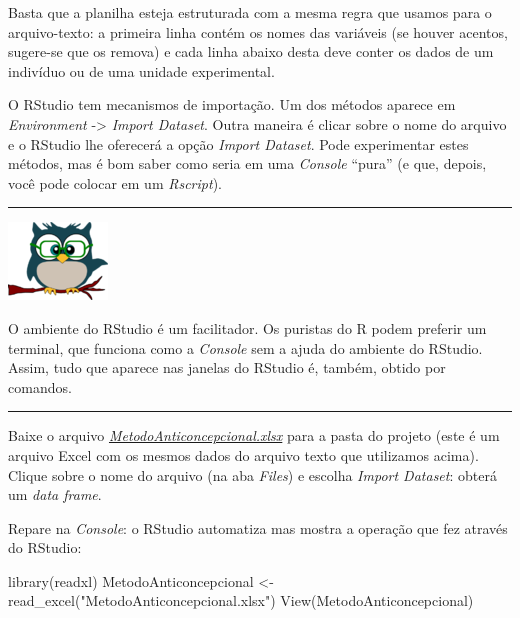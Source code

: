 \documentclass[
]{article}
\newenvironment{Shaded}{\begin{snugshade}}{\end{snugshade}}
\newcommand{\FunctionTok}[1]{\textcolor[rgb]{0.00,0.00,0.00}{#1}}
\newcommand{\NormalTok}[1]{#1}
\newcommand{\OtherTok}[1]{\textcolor[rgb]{0.56,0.35,0.01}{#1}}
\newcommand{\StringTok}[1]{\textcolor[rgb]{0.31,0.60,0.02}{#1}}
\begin{document}
Basta que a planilha esteja estruturada com a mesma regra que usamos
para o arquivo-texto: a primeira linha contém os nomes das variáveis (se
houver acentos, sugere-se que os remova) e cada linha abaixo desta deve
conter os dados de um indivíduo ou de uma unidade experimental.

O RStudio tem mecanismos de importação. Um dos métodos aparece em
\emph{Environment} -\textgreater{} \emph{Import Dataset}. Outra maneira
é clicar sobre o nome do arquivo e o RStudio lhe oferecerá a opção
\emph{Import Dataset}. Pode experimentar estes métodos, mas é bom saber
como seria em uma \emph{Console} ``pura'' (e que, depois, você pode
colocar em um \emph{Rscript}).

\begin{center}\rule{0.5\linewidth}{0.5pt}\end{center}

\begin{flushleft}\includegraphics[width=0.08\linewidth]{coruja} \end{flushleft}

O ambiente do RStudio é um facilitador. Os puristas do R podem preferir
um terminal, que funciona como a \emph{Console} sem a ajuda do ambiente
do RStudio. Assim, tudo que aparece nas janelas do RStudio é, também,
obtido por comandos.

\begin{center}\rule{0.5\linewidth}{0.5pt}\end{center}

Baixe o arquivo \emph{\url{MetodoAnticoncepcional.xlsx}} para a pasta do
projeto (este é um arquivo Excel com os mesmos dados do arquivo texto
que utilizamos acima). Clique sobre o nome do arquivo (na aba
\emph{Files}) e escolha \emph{Import Dataset}: obterá um \emph{data
frame}.

Repare na \emph{Console}: o RStudio automatiza mas mostra a operação que
fez através do RStudio:

\begin{Shaded}
\begin{Highlighting}[]
\FunctionTok{library}\NormalTok{(readxl)}
\NormalTok{MetodoAnticoncepcional }\OtherTok{\textless{}{-}} \FunctionTok{read\_excel}\NormalTok{(}\StringTok{"MetodoAnticoncepcional.xlsx"}\NormalTok{)}
\FunctionTok{View}\NormalTok{(MetodoAnticoncepcional)}
\end{Highlighting}
\end{Shaded}
\end{document}
